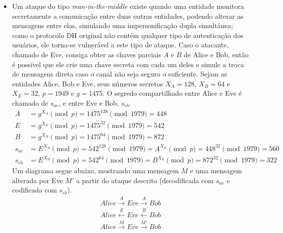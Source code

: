 \documentclass{article}
\begin{document}
\begin{itemize}
O tamanho de $\approx 80$ bits obtido para os números primos aleatórios acontece
pois a extração de raízes primitivas é um processo custoso; depois de
otimizações no cálculo da função totiente de Euler e da utilização de uma
implementação alternativa da linguagem
Python\footnote{\href{http://pypy.org/}{PyPy} --- o principal recurso
apresentado é a utilização de um compilador JIT (\emph{just-in-time}).},
percebeu-se que uma abordagem diferente seria necessária para que tal processo
fosse acelerado, como uma mudança de linguagem de programação, e assim todo o
ecossistema já construído para o trabalho precisaria ser refeito. Portanto, a
prova de conceito é demonstrada com números de tamanho reduzido.

\item Um ataque do tipo \emph{man-in-the-middle} existe quando uma entidade
monitora secretamente a comunicação entre duas outras entidades, podendo alterar
as mensagens entre elas, simulando uma impersonificação dupla simultânea; como o
protocolo DH original não contém qualquer tipo de autenticação dos usuários, ele
torna-se vulnerável a este tipo de ataque. Caso o atacante, chamado de Eve,
consiga obter as chaves parciais $A$ e $B$ de Alice e Bob, então é possível que
ele crie uma chave secreta com cada um deles e simule a troca de mensagens
direta caso o canal não seja seguro o suficiente. Sejam as entidades Alice, Bob
e Eve, seus números secretos $X_A = 128$, $X_B = 64$ e $X_E = 32$, $p = 1949$ e
$g = 1475$. O segredo compartilhado entre Alice e Eve é chamado de $s_{ae}$, e
entre Eve e Bob, $s_{eb}$.
\begin{align*}
A &= g^{X_A} \pmod{p} = 1475^{128} \pmod{1979} = 448 \\
E &= g^{X_E} \pmod{p} = 1475^{32} \pmod{1979} = 542 \\
B &= g^{X_B} \pmod{p} = 1475^{64} \pmod{1979} = 872 \\
s_{ae} &= E^{X_A} \pmod{p} = 542^{128} \pmod{1979}
        = A^{X_E} \pmod{p} = 448^{32} \pmod{1979} = 560 \\
s_{eb} &= E^{X_B} \pmod{p} = 542^{64} \pmod{1979}
        = B^{X_E} \pmod{p} = 872^{32} \pmod{1979} = 322
\end{align*}
Um diagrama segue abaixo, mostrando uma mensagem $M$ e uma mensagem alterada por
Eve $M'$ a partir do ataque descrito (decodificada com $s_{ae}$ e codificada com
$s_{eb}$).
\begin{align*}
Alice \overset{A}{\longrightarrow} Eve \overset{A}{\longrightarrow} Bob \\
Alice \overset{E}{\longleftarrow} Eve \overset{B}{\longleftarrow} Bob \\
Alice \overset{M}{\longrightarrow} Eve \overset{M'}{\longrightarrow} Bob
\end{align*}


\end{itemize}
\end{document}
